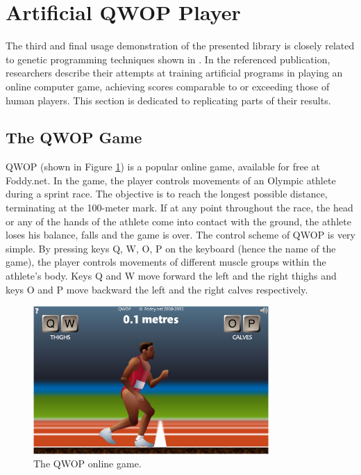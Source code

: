 \section{Artificial QWOP Player}
The third and final usage demonstration of the presented library is closely related to genetic programming techniques shown in \cite{EvolvingQwopGaits}. In the referenced publication, researchers describe their attempts at training artificial programs in playing an online computer game, achieving scores comparable to or exceeding those of human players. This section is dedicated to replicating parts of their results.

\subsection{The QWOP Game}
QWOP (shown in Figure \ref{figure:QWOP}) is a popular online game, available for free at Foddy.net. \cite{QwopWebsite} In the game, the player controls movements of an Olympic athlete during a sprint race. The objective is to reach the longest possible distance, terminating at the 100-meter mark. If at any point throughout the race, the head or any of the hands of the athlete come into contact with the ground, the athlete loses his balance, falls and the game is over. The control scheme of QWOP is very simple. By pressing keys Q, W, O, P on the keyboard (hence the name of the game), the player controls movements of different muscle groups within the athlete's body. Keys Q and W move forward the left and the right thighs and keys O and P move backward the left and the right calves respectively.

\begin{figure}[ht]
	\centering
	\includegraphics[width=0.8\textwidth]{img/qwop.png}
	\caption[The QWOP online game.]{The QWOP online game. \cite{QwopWebsite}}
	\label{figure:QWOP}
\end{figure}


